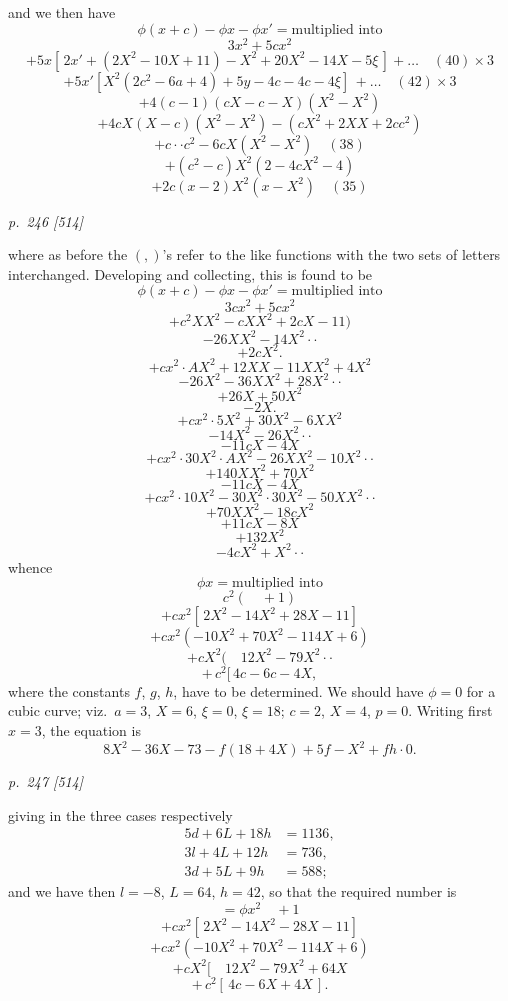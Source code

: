 \documentclass[11pt,a4paper]{book}
\begin{document}
and we then have
\[
\phi(x + c) - \phi x - \phi x' = \text{multiplied into}
\]
\[
3x^2 + 5cx^2
\]
\[
+ 5x[\,2x' + (2X^2 - 10X + 11) - X^2 + 20X^2 - 14X - 5\xi\,] + \ldots \quad (40) \times 3
\]
\[
+ 5x'[X^2(2c^2 - 6a + 4) + 5y - 4c - 4c - 4\xi]\,+\ldots \quad (42) \times 3
\]
\[
+ 4(c - 1)(cX - c - X)(X^2 - X^2)
\]
\[
+ 4cX(X - c)(X^2 - X^2) - (cX^2 + 2XX + 2cc^2)
\]
\[
+ c\cdot \cdot c^2 - 6c X(X^2 - X^2) \quad (38)
\]
\[
+ (c^2 - c)X^2(2 - 4cX^2 - 4)
\]
\[
+ 2c(x - 2)X^2(x - X^2) \quad (35)
\]

\clearpage

\bigskip
\textit{p.~246 [514]}
\smallskip

\noindent
where as before the $(,)$'s refer to the like functions with the two sets of letters
interchanged.  Developing and collecting, this is found to be
\[
\phi(x + c) - \phi x - \phi x' = \text{multiplied into}
\]
\[
3cx^2 + 5cx^2
\]
\[
+ c^2 X X^2 - cX X^2 + 2cX - 11)
\]
\[
- 26X X^2 - 14X^2 \cdot \cdot
\]
\[
+ 2c X^2.
\]
\[
+ c x^2 \cdot AX^2 + 12X X - 11X X^2 + 4X^2
\]
\[
- 26X^2 - 36X X^2 + 28X^2 \cdot \cdot
\]
\[
+ 26X + 50X^2
\]
\[
- 2X.
\]
\[
+ c x^2 \cdot 5X^2 + 30X^2 - 6X X^2
\]
\[
- 14X^2 - 26X^2 \cdot \cdot
\]
\[
- 11cX - 4X
\]
\[
+ c x^2 \cdot 30X^2 \cdot AX^2 - 26X X^2 - 10X^2 \cdot \cdot
\]
\[
+ 140X X^2 + 70X^2
\]
\[
- 11cX - 4X
\]
\[
+ c x^2 \cdot 10X^2 - 30X^2 \cdot 30X^2 - 50X X^2 \cdot \cdot
\]
\[
+ 70X X^2 - 18cX^2
\]
\[
+ 11cX - 8X
\]
\[
+ 132 X^2
\]
\[
- 4c X^2 + X^2 \cdot \cdot
\]
whence
\[
\phi x = \text{multiplied into}
\]
\[
c^2 (\quad + 1)
\]
\[
+ c x^2[\,2X^2 - 14X^2 + 28X - 11]
\]
\[
+ c x^2 (-10X^2 + 70X^2 - 114X + 6)
\]
\[
+ c X^2 (\quad 12X^2 - 79X^2 \cdot \cdot
\]
\[
+ \,c^2 [\,4c - 6c - 4X,
\]
where the constants $f$, $g$, $h$, have to be determined.  We should have $\phi = 0$ for a
cubic curve; viz.\ $a = 3$, $X = 6$, $\xi = 0$, $\xi = 18$; $c = 2$, $X = 4$, $p = 0$.  Writing first
$x = 3$, the equation is
\[
8X^2 - 36X - 73 - f(18 + 4X) + 5f - X^2 + f h \cdot 0.
\]

\clearpage

\bigskip
\textit{p.~247 [514]}
\smallskip

\noindent
giving in the three cases respectively
\begin{align*}
5d + 6L + 18h &= 1136, \\
3l + 4L + 12h &= 736, \\
3d + 5L + 9h &= 588;
\end{align*}
and we have then $l = -8$, $L = 64$, $h = 42$, so that the required number is
\[
= \phi x^2 \quad + 1
\]
\[
+ c x^2 [\,2X^2 - 14X^2 - 28X - 11]
\]
\[
+ c x^2 (-10X^2 + 70X^2 - 114X + 6)
\]
\[
+ c X^2 [\quad 12X^2 - 79X^2 + 64X
\]
\[
+ \,c^2 [\,4c - 6X + 4X\,].
\]
\end{document}

